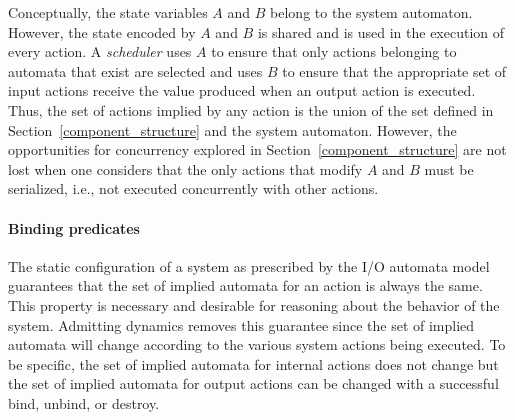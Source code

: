 

Conceptually, the state variables $A$ and $B$ belong to the system automaton.
However, the state encoded by $A$ and $B$ is shared and is used in the execution of every action.
A \emph{scheduler} uses $A$ to ensure that only actions belonging to automata that exist are selected and uses $B$ to ensure that the appropriate set of input actions receive the value produced when an output action is executed.
Thus, the set of actions implied by any action is the union of the set defined in Section~\ref{component_structure} and the system automaton.
However, the opportunities for concurrency explored in Section~\ref{component_structure} are not lost when one considers that the only actions that modify $A$ and $B$ must be serialized, i.e., not executed concurrently with other actions.

\paragraph*{Binding predicates}
The static configuration of a system as prescribed by the I/O automata model guarantees that the set of implied automata for an action is always the same.
This property is necessary and desirable for reasoning about the behavior of the system.
Admitting dynamics removes this guarantee since the set of implied automata will change according to the various system actions being executed.
To be specific, the set of implied automata for internal actions does not change but the set of implied automata for output actions can be changed with a successful bind, unbind, or destroy.

